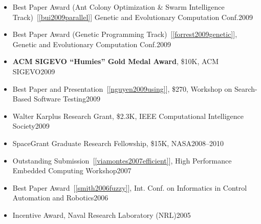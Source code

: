 \documentclass[11pt]{article}
\begin{document}
\begin{itemize}
    
    \item Best Paper Award (Ant Colony Optimization \& Swarm Intelligence Track)~[\ref{bui2009parallel}] Genetic and Evolutionary Computation Conf.\hfill 2009
    \item Best Paper Award (Genetic Programming Track)~[\ref{forrest2009genetic}], Genetic and Evolutionary Computation Conf.\hfill 2009
    \item \textbf{ACM SIGEVO “Humies” Gold Medal Award}, \$10K, ACM SIGEVO\hfill 2009
    \item Best Paper and Presentation~[\ref{nguyen2009using}], \$270, Workshop on Search-Based Software Testing\hfill 2009
    
    
    \item Walter Karplus Research Grant, \$2.3K, IEEE Computational Intelligence Society\hfill 2009
    \item SpaceGrant Graduate Research Fellowship, \$15K, NASA\hfill 2008--2010
    \item Outstanding Submission~[\ref{viamontes2007efficient}], High Performance Embedded Computing Workshop\hfill 2007
    \item  Best Paper Award~[\ref{smith2006fuzzy}],  Int. Conf. on Informatics in Control Automation and Robotics\hfill 2006
    \item Incentive Award,  Naval Research Laboratory (NRL)\hfill 2005
\end{itemize}
\end{document}
